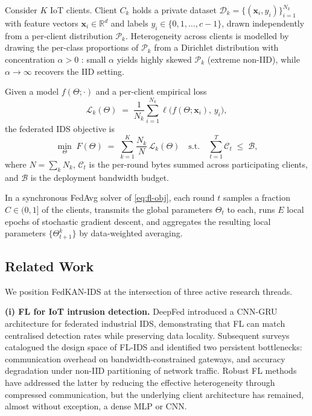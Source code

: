 \begin{definition}\label{def:fl-ids}
Consider $K$ IoT clients. Client $C_k$ holds a private dataset $\mathcal{D}_k = \{(\mathbf{x}_i, y_i)\}_{i=1}^{N_k}$ with feature vectors $\mathbf{x}_i \in \mathbb{R}^d$ and labels $y_i \in \{0, 1, \ldots, c-1\}$, drawn independently from a per-client distribution $\mathcal{P}_k$. Heterogeneity across clients is modelled by drawing the per-class proportions of $\mathcal{P}_k$ from a Dirichlet distribution with concentration $\alpha > 0$ \cite{hsu2019measuring}: small $\alpha$ yields highly skewed $\mathcal{P}_k$ (extreme non-IID), while $\alpha \to \infty$ recovers the IID setting.

Given a model $f(\Theta; \cdot)$ and a per-client empirical loss
\begin{equation}
\mathcal{L}_k(\Theta) \;=\; \frac{1}{N_k}\sum_{i=1}^{N_k} \ell\big(f(\Theta; \mathbf{x}_i),\, y_i\big),
\end{equation}
the federated IDS objective is
\begin{equation}\label{eq:fl-obj}
\min_{\Theta} \; F(\Theta) \;=\; \sum_{k=1}^{K} \frac{N_k}{N}\, \mathcal{L}_k(\Theta) \quad\text{s.t.}\quad \sum_{t=1}^{T} \mathcal{C}_t \;\leq\; \mathcal{B},
\end{equation}
where $N = \sum_k N_k$, $\mathcal{C}_t$ is the per-round bytes summed across participating clients, and $\mathcal{B}$ is the deployment bandwidth budget.
\end{definition}

In a synchronous FedAvg \cite{mcmahan2017fedavg,kairouz2021advances} solver of \eqref{eq:fl-obj}, each round $t$ samples a fraction $C \in (0, 1]$ of the clients, transmits the global parameters $\Theta_t$ to each, runs $E$ local epochs of stochastic gradient descent, and aggregates the resulting local parameters $\{\Theta_{t+1}^k\}$ by data-weighted averaging.

\subsection{Related Work}\label{subsec:related}

We position FedKAN-IDS at the intersection of three active research threads.

\textbf{(i) FL for IoT intrusion detection.} DeepFed \cite{li2020deepfed} introduced a CNN-GRU architecture for federated industrial IDS, demonstrating that FL can match centralised detection rates while preserving data locality. Subsequent surveys \cite{nguyen2021fl-iot-survey} catalogued the design space of FL-IDS and identified two persistent bottlenecks: communication overhead on bandwidth-constrained gateways, and accuracy degradation under non-IID partitioning of network traffic. Robust FL methods \cite{sattler2019sparse} have addressed the latter by reducing the effective heterogeneity through compressed communication, but the underlying client architecture has remained, almost without exception, a dense MLP or CNN.


